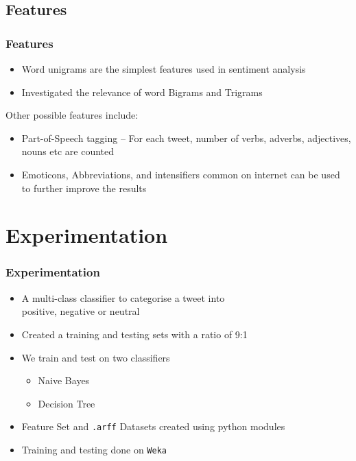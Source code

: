 \documentclass{beamer}
\begin{document}
\subsection{Features}

\begin{frame}
\frametitle{Features}
\begin{itemize}
\item Word unigrams are the simplest features used in sentiment analysis
\item Investigated the relevance of word Bigrams and Trigrams
\end{itemize}
Other possible features include:
\begin{itemize}
\item Part-of-Speech tagging -- For each tweet, number of verbs, adverbs, adjectives, nouns etc are counted
\item Emoticons, Abbreviations, and intensifiers common on internet can be used to further improve the results
\end{itemize}

\end{frame}

\section{Experimentation}

\begin{frame}
\frametitle{Experimentation}
\begin{itemize}
\item A multi-class classifier to categorise a tweet into\\ positive, negative or neutral
\item Created a training and testing sets with a ratio of 9:1
\item We train and test on two classifiers
	\begin{itemize}
	\item Naive Bayes
	\item Decision Tree	
	\end{itemize}
\item Feature Set and \texttt{.arff} Datasets created using python modules
\item Training and testing done on \texttt{Weka}
\end{itemize}
\end{frame}
\end{document}

